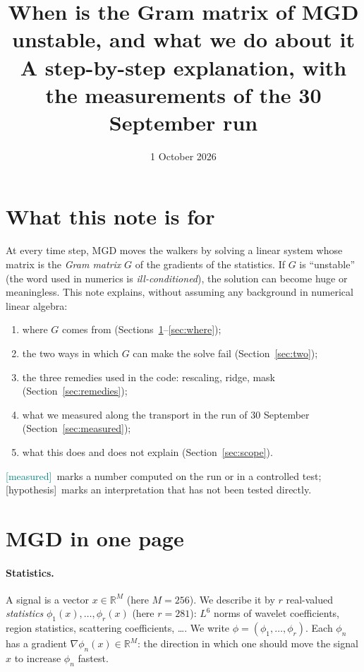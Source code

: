 \documentclass[11pt,a4paper]{article}
\title{When is the Gram matrix of MGD unstable, and what we do about it\\[2pt]
\large A step-by-step explanation, with the measurements of the 30 September run}
\author{}
\date{1 October 2026}
\newcommand{\meas}{\textcolor{teal}{\textsf{[measured]}}}
\newcommand{\hyp}{\textcolor{orange!80!black}{\textsf{[hypothesis]}}}
\begin{document}
\maketitle

\section*{What this note is for}
At every time step, MGD moves the walkers by solving a linear system whose matrix is the
\emph{Gram matrix} $G$ of the gradients of the statistics. If $G$ is ``unstable''
(the word used in numerics is \emph{ill-conditioned}), the solution can become huge or
meaningless. This note explains, without assuming any background in numerical linear
algebra:
\begin{enumerate}
  \item where $G$ comes from (Sections~\ref{sec:mgd}--\ref{sec:where});
  \item the two ways in which $G$ can make the solve fail (Section~\ref{sec:two});
  \item the three remedies used in the code: rescaling, ridge, mask (Section~\ref{sec:remedies});
  \item what we measured along the transport in the run of 30 September (Section~\ref{sec:measured});
  \item what this does and does not explain (Section~\ref{sec:scope}).
\end{enumerate}
\meas\ marks a number computed on the run or in a controlled test; \hyp\ marks an
interpretation that has not been tested directly.

\section{MGD in one page}\label{sec:mgd}

\paragraph{Statistics.} A signal is a vector $x\in\mathbb R^M$ (here $M=256$). We describe it by
$r$ real-valued \emph{statistics} $\phi_1(x),\dots,\phi_r(x)$ (here $r=281$): $L^6$ norms of
wavelet coefficients, region statistics, scattering coefficients, \dots. We write
$\phi=(\phi_1,\dots,\phi_r)$. Each $\phi_n$ has a gradient $\nabla\phi_n(x)\in\mathbb R^M$: the
direction in which one should move the signal $x$ to increase $\phi_n$ fastest.
\end{document}
